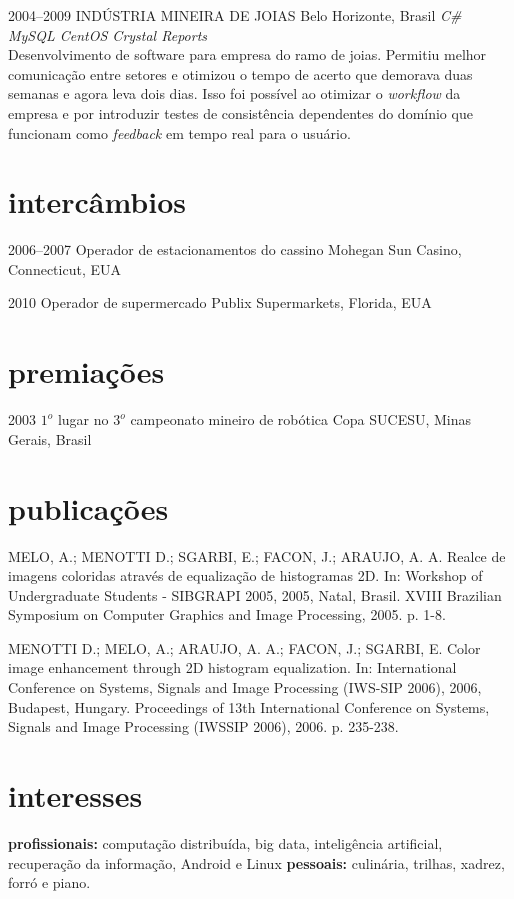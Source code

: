 \documentclass[]{friggeri-cv}
\begin{document}
\begin{entrylist}
\entry
{2004--2009}
{INDÚSTRIA MINEIRA DE JOIAS}
{Belo Horizonte, Brasil}
{\emph{\bullet C\# \bullet MySQL \bullet CentOS \bullet Crystal Reports } \\ Desenvolvimento de software para empresa do ramo de joias. Permitiu melhor comunicação entre setores e otimizou o tempo de acerto que demorava duas semanas e agora leva dois dias. Isso foi possível ao otimizar o \textit{workflow} da empresa e por introduzir testes de consistência dependentes do domínio que funcionam como \textit{feedback} em tempo real para o usuário.}

\end{entrylist}

\section{intercâmbios} 

\begin{entrylist}

\entry
{2006--2007}
{Operador {\normalfont de estacionamentos do cassino}}
{Mohegan Sun Casino, Connecticut, EUA}

\entry
{2010} 
{Operador {\normalfont de supermercado}}
{Publix Supermarkets, Florida, EUA}

\end{entrylist}

\section{premiações}

\begin{entrylist}

\entry
{2003} 
{$1^{o}$ lugar {\normalfont no $3^{o}$ campeonato mineiro de robótica}}
{Copa SUCESU, Minas Gerais, Brasil}

\end{entrylist}

\section{publicações}

MELO, A.; MENOTTI D.; SGARBI, E.; FACON, J.; ARAUJO, A. A. Realce de imagens coloridas através de equalização de histogramas 2D. In: Workshop of Undergraduate Students - SIBGRAPI 2005, 2005, Natal, Brasil. XVIII Brazilian Symposium on Computer Graphics and Image Processing, 2005. p. 1-8.

MENOTTI D.; MELO, A.; ARAUJO, A. A.; FACON, J.; SGARBI, E. Color image enhancement through 2D histogram equalization. In: International Conference on Systems, Signals and Image Processing (IWS-SIP 2006), 2006, Budapest, Hungary. Proceedings of 13th International Conference on Systems, Signals and Image Processing (IWSSIP 2006), 2006. p. 235-238.

\section{interesses}

\textbf{profissionais:} computação distribuída, big data, inteligência artificial, recuperação da informação, Android e Linux \textbf{pessoais:} culinária, trilhas,  xadrez, forró e piano.
\end{document}
